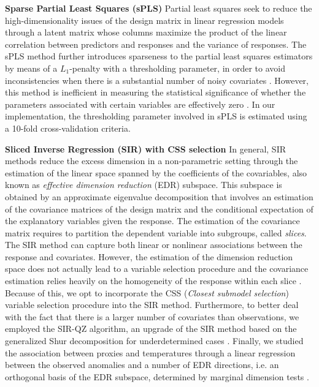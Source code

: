 \documentclass[12pt]{amsart}
\theoremstyle{plain}
\theoremstyle{definition}
\theoremstyle{remark}
\begin{document}
{\bf Sparse Partial Least Squares (sPLS)}
  Partial least squares seek to reduce the high-dimensionality issues of the
  design matrix in  
  linear regression models through a latent matrix whose columns maximize
  the product of the linear correlation between predictors and responses and the
  variance of responses. The sPLS method further introduces sparseness to the partial least squares
  estimators by means of a $L_1$-penalty with a thresholding parameter, in order to avoid inconsistencies when there is a
  substantial number of noisy covariates \citep{Chun2010,Chung2013}. However, this method is inefficient in
  measuring the statistical significance of whether the parameters associated with certain
  variables are effectively zero \citep{OlsonHunt2014}. In our implementation, the
  thresholding parameter involved in sPLS is estimated using a 10-fold cross-validation criteria.    

{\bf Sliced Inverse Regression (SIR) with CSS selection}
  In general, SIR methods \citep{Li1991}  reduce the excess dimension in a non-parametric setting through the
  estimation of the linear space spanned by the coefficients of the covariables,
  also known as \textit{effective dimension reduction} (EDR) subspace. 
  This subspace is obtained by an approximate eigenvalue decomposition that
  involves an estimation of the covariance matrices of the design matrix and
  the conditional expectation of the explanatory variables given the
  response. The
  estimation of the covariance matrix requires to partition the dependent variable into subgroups, called \textit{slices}.
  The SIR method can capture both linear or nonlinear associations between the response and
  covariates. However, the estimation of the dimension
  reduction space does not actually lead to a variable selection procedure and the
  covariance estimation relies heavily on the homogeneity of the response within
  each slice \citep{Wu2010}. Because of this, we opt to incorporate the CSS
  (\textit{Closest submodel selection}) variable 
  selection procedure into the SIR method. Furthermore, to better deal with the fact that there is a larger number of
  covariates than observations, we employed the SIR-QZ algorithm, an upgrade of the SIR method based on the generalized Shur decomposition for underdetermined cases \citep{Coudret2014,Coudret2017}.   
  Finally, we studied the association between proxies and temperatures
  through a linear regression between the observed anomalies and a number of EDR directions, i.e. an orthogonal basis of the EDR subspace, determined by marginal dimension tests \citep{Cook2004}. 
  
\end{document}

